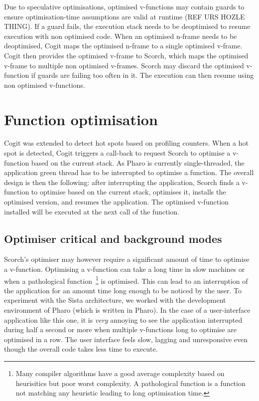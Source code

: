 \documentclass[a4paper,12pt,twoside]{../includes/ThesisStyle}
\begin{document}
Due to speculative optimisations, optimised v-functions may contain guards to ensure optimisation-time assumptions are valid at runtime (REF URS HOZLE THING). If a guard fails, the execution stack needs to be deoptimised to resume execution with non optimised code. When an optimised n-frame needs to be deoptimised, Cogit maps the optimised n-frame to a single optimised v-frame. Cogit then provides the optimised v-frame to Scorch, which maps the optimised v-frame to multiple non optimised v-frames. Scorch may discard the optimised v-function if guards are failing too often in it. The execution can then resume using non optimised v-functions.


\section {Function optimisation}

Cogit was extended to detect hot spots based on profiling counters. When a hot spot is detected, Cogit triggers a call-back to request Scorch to optimise a v-function based on the current stack. As Pharo is currently single-threaded, the application green thread has to be interrupted to optimise a function. The overall design is then the following: after interrupting the application, Scorch finds a v-function to optimise based on the current stack, optimises it, installs the optimised version, and resumes the application. The optimised v-function installed will be executed at the next call of the function.

\subsection{Optimiser critical and background modes}

Scorch's optimiser may however require a significant amount of time to optimise a v-function. Optimising a v-function can take a long time in slow machines or when a pathological function~\footnote{Many compiler algorithms have a good average complexity based on heurisitics but poor worst complexity. A pathological function is a function not matching any heuristic leading to long optimisation time.} is optimised. This can lead to an interruption of the application for an amount time long enough to be noticed by the user. To experiment with the Sista architecture, we worked with the development environment of Pharo (which is written in Pharo). In the case of a user-interface application like this one, it is \emph{very} annoying to see the application interrupted during half a second or more when multiple v-functions long to optimise are optimised in a row. The user interface feels slow, lagging and unresponsive even though the overall code takes less time to execute.
\end{document}
